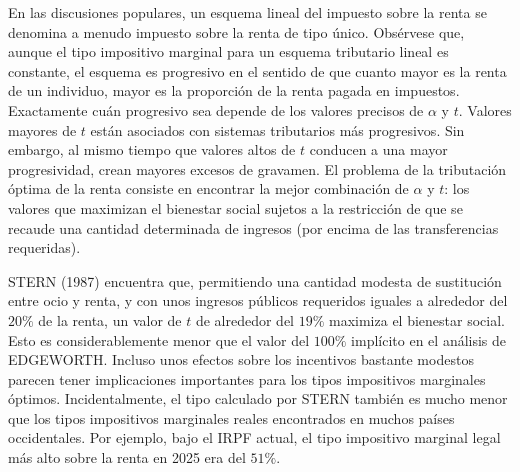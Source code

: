 \documentclass[10pt,a4paper]{article}
\begin{document}
En las discusiones populares, un esquema lineal del impuesto sobre la renta se denomina a menudo impuesto sobre la renta de tipo único. Obsérvese que, aunque el tipo impositivo marginal para un esquema tributario lineal es constante, el esquema es progresivo en el sentido de que cuanto mayor es la renta de un individuo, mayor es la proporción de la renta pagada en impuestos. Exactamente cuán progresivo sea depende de los valores precisos de $\alpha$ y $t$. Valores mayores de $t$ están asociados con sistemas tributarios más progresivos. Sin embargo, al mismo tiempo que valores altos de $t$ conducen a una mayor progresividad, crean mayores excesos de gravamen. El problema de la tributación óptima de la renta consiste en encontrar la mejor combinación de $\alpha$ y $t$: los valores que maximizan el bienestar social sujetos a la restricción de que se recaude una cantidad determinada de ingresos (por encima de las transferencias requeridas).
    
STERN (1987) encuentra que, permitiendo una cantidad modesta de sustitución entre ocio y renta, y con unos ingresos públicos requeridos iguales a alrededor del $20\%$ de la renta, un valor de $t$ de alrededor del $19\%$ maximiza el bienestar social. Esto es considerablemente menor que el valor del $100\%$ implícito en el análisis de EDGEWORTH. Incluso unos efectos sobre los incentivos bastante modestos parecen tener implicaciones importantes para los tipos impositivos marginales óptimos. Incidentalmente, el tipo calculado por STERN también es mucho menor que los tipos impositivos marginales reales encontrados en muchos países occidentales. Por ejemplo, bajo el IRPF actual, el tipo impositivo marginal legal más alto sobre la renta en 2025 era del $51\%$.
    
\end{document}
